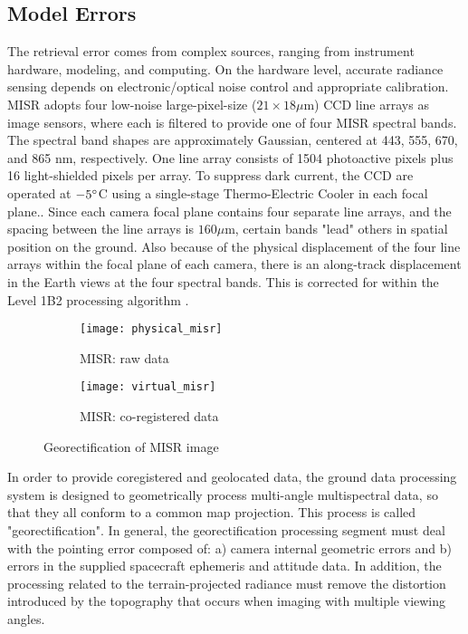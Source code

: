\subsection{Model Errors}
The retrieval error comes from complex sources, ranging from instrument hardware, modeling, and computing. On the hardware level, accurate radiance sensing depends on electronic/optical noise control and appropriate calibration\cite{misr_calibration}. MISR adopts four low-noise large-pixel-size ($21\times18\mu$m) CCD line arrays as image sensors, where each is filtered to provide one of four MISR spectral bands. The spectral band shapes are approximately Gaussian, centered at 443, 555, 670, and 865 nm, respectively. One line array consists of 1504 photoactive pixels plus 16 light-shielded pixels per array. To suppress dark current, the CCD are operated at $-5\degree$C using a single-stage Thermo-Electric Cooler in each focal plane.\cite{diner1998}. Since each camera focal plane contains four separate line arrays, and the spacing between the line arrays is $160\mu$m, certain bands "lead" others in spatial position on the ground. Also because of the physical displacement of the four line arrays within the focal plane of each camera, there is an along-track displacement in the Earth views at the four spectral bands. This is corrected for within the Level 1B2 processing algorithm \cite{misr_projection}.

\begin{figure}[h!]
    \centering
    \begin{subfigure}{.41\textwidth}
        \centering
        \texttt{[image: physical\_misr]}
        \caption{MISR: raw data}
        \label{fig:physical_misr}
    \end{subfigure}
    \begin{subfigure}{.49\textwidth}
        \centering
        \texttt{[image: virtual\_misr]}
        \caption{MISR: co-registered data}
        \label{fig:virtual_misr}
    \end{subfigure}
    \caption{Georectification of MISR image \cite{misr_projection}}
\end{figure}

In order to provide coregistered and geolocated data, the ground data processing system is designed to geometrically process multi-angle multispectral data, so that they all conform to a common map projection. This process is called "georectification". In general, the georectification processing segment must deal with the pointing error composed of: a) camera internal geometric errors and b) errors in the supplied spacecraft ephemeris and attitude data. In addition, the processing related to the terrain-projected radiance must remove the distortion introduced by the topography that occurs when imaging with multiple viewing angles.

